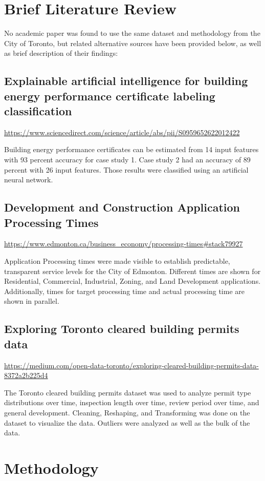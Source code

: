 \documentclass{article}
\begin{document}
\newpage
\section{Brief Literature Review}
No academic paper was found to use the same dataset and methodology from the City of Toronto, but related alternative sources have been provided below, as well as brief description of their findings:

\subsection{Explainable artificial intelligence for building energy performance certificate labeling classification}
\url{https://www.sciencedirect.com/science/article/abs/pii/S0959652622012422}

Building energy performance certificates can be estimated from 14 input features with 93 percent accuracy for case study 1. Case study 2 had an accuracy of 89 percent with 26 input features. Those results were classified using an artificial neural network.

\subsection{Development and Construction Application Processing Times}
\url{https://www.edmonton.ca/business_economy/processing-times#stack79927}

Application Processing times were made visible to establish predictable, transparent service levels for the City of Edmonton. Different times are shown for Residential, Commercial, Industrial, Zoning, and Land Development applications. Additionally, times for target processing time and actual processing time are shown in parallel.

\subsection{Exploring Toronto cleared building permits data}
\url{https://medium.com/open-data-toronto/exploring-cleared-building-permits-data-8372a2b225d4}

The Toronto cleared building permits dataset was used to analyze permit type distributions over time, inspection length over time, review period over time, and general development. Cleaning, Reshaping, and Transforming was done on the dataset to visualize the data. Outliers were analyzed as well as the bulk of the data.


\section{Methodology}
\label{sec:headings}
\end{document}
